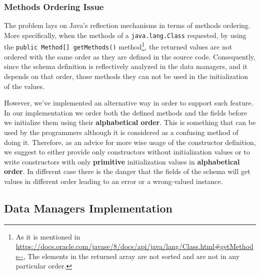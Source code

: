 \subsubsection{Methods Ordering Issue}\label{Methods ordering}
The problem lays on Java's reflection mechanisms in terms of methods ordering.
More specifically, when the methods of a \texttt{java.lang.Class} requested, by using the \texttt{public Method[] getMethods()} method\footnote{As it is mentioned in \url{https://docs.oracle.com/javase/8/docs/api/java/lang/Class.html\#getMethods--}, The elements in the returned array are not sorted and are not in any particular order.}, the returned values are not ordered with the same order as they are defined in the source code.
Consequently, since the schema definition is reflectively analyzed in the data managers, and it depends on that order, those methods they can not be used in the initialization of the values.

However, we've implemented an alternative way in order to support such feature.
In our implementation we order both the defined methods and the fields before we initialize them using their \textbf{alphabetical order}.
This is something that can be used by the programmers although it is considered as a confusing method of doing it.
Therefore, as an advice for more wise usage of the constructor definition, we suggest to either provide only constructors without initialization values or to write constructors with only \textbf{primitive} initialization values in \textbf{alphabetical order}.
In different case there is the danger that the fields of the schema will get values in different order leading to an error or a wrong-valued instance.

\subsection{Data Managers Implementation}\label{Data Managers Implementation}




